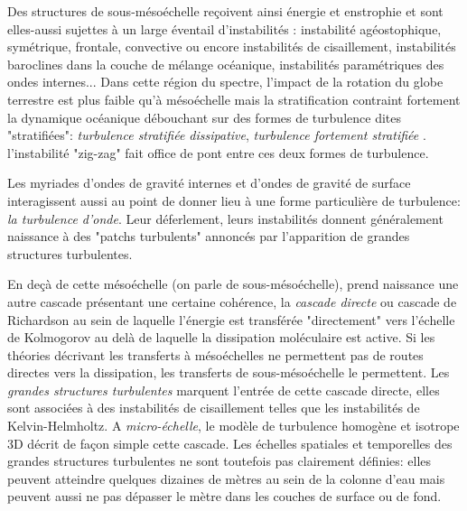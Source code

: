 Des structures de sous-mésoéchelle reçoivent ainsi énergie et enstrophie et sont elles-aussi sujettes à un large éventail d'instabilités \citep{mcwilliams_submesoscale_2016}: instabilité agéostophique, symétrique, frontale, convective ou encore instabilités de cisaillement, instabilités baroclines dans la couche de mélange océanique, instabilités paramétriques des ondes internes... Dans cette région du spectre, l'impact de la rotation du globe terrestre est plus faible qu'à mésoéchelle mais la stratification contraint fortement la dynamique océanique débouchant sur des formes de turbulence dites "stratifiées": \textit{turbulence stratifiée dissipative}, \textit{turbulence fortement stratifiée} \citep{augier_turbulence_2012}. l'instabilité "zig-zag" fait office de pont entre ces deux formes de turbulence.

Les myriades d'ondes de gravité internes et d'ondes de gravité de surface interagissent aussi au point de donner lieu à une forme particulière de turbulence: \textit{la turbulence d'onde}. Leur déferlement, leurs instabilités donnent généralement naissance à des "patchs turbulents" annoncés par l'apparition de grandes structures turbulentes.

En deçà de cette mésoéchelle (on parle de sous-mésoéchelle), prend naissance une autre cascade présentant une certaine cohérence, la \textit{cascade directe} ou cascade de Richardson au sein de laquelle l'énergie est transférée "directement" vers l'échelle de Kolmogorov au delà de laquelle la dissipation moléculaire est active. Si les théories décrivant les transferts à mésoéchelles ne permettent pas de routes directes vers la dissipation, les transferts de sous-mésoéchelle le permettent.
Les \textit{grandes structures turbulentes} marquent l'entrée de cette cascade directe, elles sont associées à des instabilités de cisaillement telles que les instabilités de Kelvin-Helmholtz. A \textit{micro-échelle}, le modèle de turbulence homogène et isotrope 3D décrit de façon simple cette cascade. Les échelles spatiales et temporelles des grandes structures turbulentes ne sont toutefois pas clairement définies: elles peuvent atteindre quelques dizaines de mètres au sein de la colonne d'eau mais peuvent aussi ne pas dépasser le mètre dans les couches de surface ou de fond.

